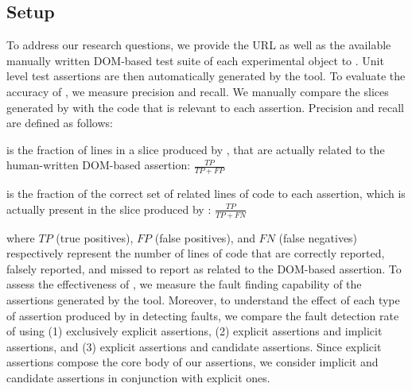 \subsection{Setup} \label{Sec:setup}
To address our research questions, we provide the URL as well as the available manually written DOM-based test suite of each experimental object to \tool. Unit level test assertions are then automatically generated by the tool.
 To evaluate the accuracy of \tool, we measure precision and recall. We manually compare the slices generated by \tool with the \javascript code that is relevant to each assertion. Precision and recall are defined as follows:
\begin{description}[noitemsep, nolistsep, font=\normalfont\itshape]
\item [Precision] is the fraction of lines in a slice produced by \tool, that are actually related to the human-written DOM-based assertion: $\frac{TP}{TP+FP}$ 
\item [Recall] is the fraction of the correct set of related lines of code to each assertion, which is actually present in the slice produced by \tool: $\frac{TP}{TP+FN}$ 
\end{description}
where $TP$ (true positives), $FP$ (false positives), and $FN$ (false negatives) respectively represent the number of lines of code that are correctly reported, falsely reported, and missed to report as related to the DOM-based assertion.
 To assess the effectiveness of \tool, we measure the fault finding capability of the assertions generated by the tool. Moreover, to understand the effect of each type of assertion produced by \tool in detecting faults, we compare the fault detection rate of using (1) exclusively explicit assertions, (2) explicit assertions and implicit assertions, and (3) explicit assertions and candidate assertions. Since explicit assertions compose the core body of our assertions, we consider implicit and candidate assertions in conjunction with explicit ones.
       
